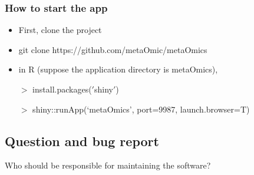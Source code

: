 \subsubsection{How to start the app}
\begin{itemize}
\item First, clone the project
\item git clone https://github.com/metaOmic/metaOmics
\item in R (suppose the application directory is metaOmics),

$>$ install.packages($'$shiny$'$)

$>$ shiny::runApp(`metaOmics', port=9987, launch.browser=T)
\end{itemize}



\subsection{Question and bug report}
{
\color{red}
Who should be responsible for maintaining the software?
}

 
